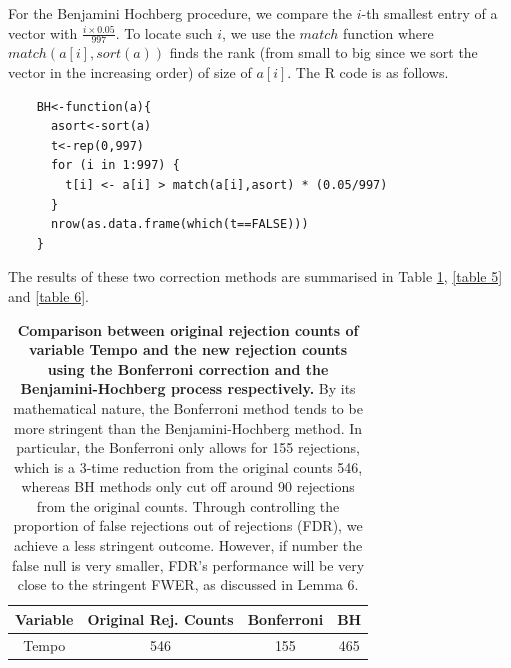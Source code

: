 \documentclass[12pt]{article}
\theoremstyle{plain}
\theoremstyle{definition}
\theoremstyle{remark}
\begin{document}
For the Benjamini Hochberg procedure, we compare the $i$-th smallest entry of a vector with $\frac{i\times 0.05}{997}$. To locate such $i$, we use the $match$ function where $match(a[i],sort(a))$ finds the rank (from small to big since we sort the vector in the increasing order) of size of $a[i]$. The R code is as follows.
\begin{verbatim}
    BH<-function(a){
      asort<-sort(a)
      t<-rep(0,997)
      for (i in 1:997) {
        t[i] <- a[i] > match(a[i],asort) * (0.05/997)
      }
      nrow(as.data.frame(which(t==FALSE)))
    }
\end{verbatim}

The results of these two correction methods are summarised in Table \ref{table 4}, \ref{table 5} and \ref{table 6}.


\begin{table}[h!]
    \centering
    \begin{tabular}{|c|c|c|c|}
        \hline
        Variable & Original Rej. Counts & Bonferroni & BH\\
        \hline
        Tempo & 546 & 155 & 465\\
        \hline
    \end{tabular}
    \caption{\textbf{Comparison between original rejection counts of variable Tempo and the new rejection counts using the Bonferroni correction and the Benjamini-Hochberg process respectively.} By its mathematical nature, the Bonferroni method tends to be more stringent than the Benjamini-Hochberg method. In particular, the Bonferroni only allows for 155 rejections, which is a 3-time reduction from the original counts 546, whereas BH methods only cut off around 90 rejections from the original counts. Through controlling the proportion of false rejections out of rejections (FDR), we achieve a less stringent outcome. However, if number the false null is very smaller, FDR's performance will be very close to the stringent FWER, as discussed in Lemma 6.}
    \label{table 4}
\end{table}
\end{document}
